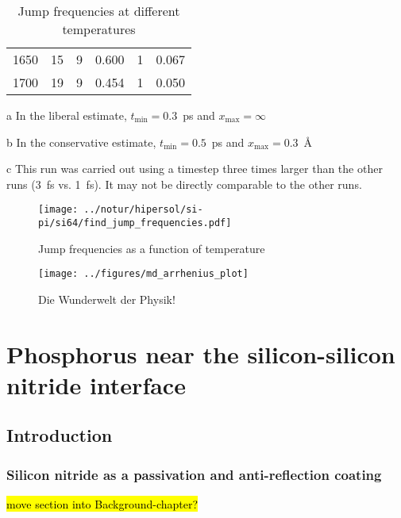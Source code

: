 \documentclass[11pt,bibliography=totoc,index=totoc]{scrbook}   %
\newcommand{\comment}[1]{\hl{#1}}
\begin{document}
\begin{table}[htbp]
\begin{threeparttable}[htbp]
\begin{tabular}{rrrrrr}
        1650 &  15 &  9 & 0.600 &  1 & 0.067 \\
        1700 &  19 &  9 & 0.454 &  1 & 0.050 \\
      \bottomrule
    \end{tabular}
    {\footnotesize
    \begin{tablenotes}
      \item[a] In the liberal estimate, $t_{\text{min}}=0.3$~ps and $x_{\text{max}}=\infty$
      \item[b] In the conservative estimate, $t_{\text{min}}=0.5$~ps and $x_{\text{max}}=0.3$~Å
      \item[c] This run was carried out using a timestep three times larger than the other runs (3~fs vs. 1~fs). 
          It may not be directly comparable to the other runs.
    \end{tablenotes}
    }
  \end{threeparttable}
  \caption{Jump frequencies at different temperatures}
  \label{tab:jumps}
\end{table}

\begin{figure}[htp]
  \centering
  \texttt{[image: ../notur/hipersol/si-pi/si64/find\_jump\_frequencies.pdf]}
  \caption{Jump frequencies as a function of temperature}
  \label{fig:jumpfreq}
\end{figure}



\begin{figure}[htbp]
  \begin{center}
    \texttt{[image: ../figures/md\_arrhenius\_plot]}
  \end{center}
  \caption{
    Die Wunderwelt der Physik!
  }
  \label{fig:md_arrhenius_plot}
\end{figure}


\chapter{Phosphorus near the silicon-silicon nitride interface}

\section{Introduction}

\subsection{Silicon nitride as a passivation and anti-reflection coating}
\comment{move section into  Background-chapter?}
\end{document}
